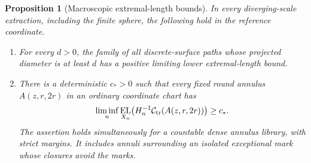 \documentclass[11pt]{article}
\numberwithin{equation}{section}
\newtheorem{proposition}[theorem]{Proposition}
\theoremstyle{definition}
\theoremstyle{remark}
\newcommand{\1}{\mathbf 1}
\DeclareMathOperator{\EL}{EL}
\begin{document}
\begin{proposition}[Macroscopic extremal-length bounds]
\label{conf:macroscopic-el}
In every diverging-scale extraction, including the finite sphere,
the following hold in the reference coordinate.
\begin{enumerate}
\item For every \(d>0\), the family of all discrete-surface paths
whose projected diameter is at least \(d\) has a positive limiting
lower extremal-length bound.
\item There is a deterministic \(c_*>0\) such that every fixed
round annulus \(A(z,r,2r)\) in an ordinary coordinate chart has
\[
 \liminf_n\EL_{X_n}\bigl(H_n^{-1}
                   \mathcal C_{\rm tr}(A(z,r,2r))\bigr)\ge c_*.
\]
The assertion holds simultaneously for a countable dense annulus
library, with strict margins.  It includes annuli surrounding an
isolated exceptional mark whose closures avoid the marks.
\end{enumerate}
\end{proposition}
\end{document}
